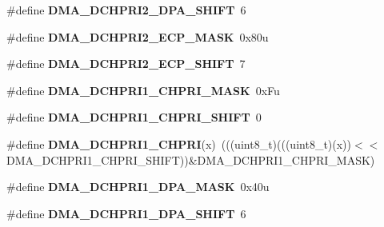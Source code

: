 \begin{DoxyCompactItemize}
\item 
\#define {\bfseries D\+M\+A\+\_\+\+D\+C\+H\+P\+R\+I2\+\_\+\+D\+P\+A\+\_\+\+S\+H\+I\+FT}~6\hypertarget{group__DMA__Register__Masks_ga1bb0bb4e70fc28664327a789d7b3f174}{}\label{group__DMA__Register__Masks_ga1bb0bb4e70fc28664327a789d7b3f174}

\item 
\#define {\bfseries D\+M\+A\+\_\+\+D\+C\+H\+P\+R\+I2\+\_\+\+E\+C\+P\+\_\+\+M\+A\+SK}~0x80u\hypertarget{group__DMA__Register__Masks_ga5d73d5f6aae29465206f72cda9bccde6}{}\label{group__DMA__Register__Masks_ga5d73d5f6aae29465206f72cda9bccde6}

\item 
\#define {\bfseries D\+M\+A\+\_\+\+D\+C\+H\+P\+R\+I2\+\_\+\+E\+C\+P\+\_\+\+S\+H\+I\+FT}~7\hypertarget{group__DMA__Register__Masks_ga139a8b64a74b8009c858a68687a388aa}{}\label{group__DMA__Register__Masks_ga139a8b64a74b8009c858a68687a388aa}

\item 
\#define {\bfseries D\+M\+A\+\_\+\+D\+C\+H\+P\+R\+I1\+\_\+\+C\+H\+P\+R\+I\+\_\+\+M\+A\+SK}~0x\+Fu\hypertarget{group__DMA__Register__Masks_ga5a655b5899c5da64b36029329ff25fb8}{}\label{group__DMA__Register__Masks_ga5a655b5899c5da64b36029329ff25fb8}

\item 
\#define {\bfseries D\+M\+A\+\_\+\+D\+C\+H\+P\+R\+I1\+\_\+\+C\+H\+P\+R\+I\+\_\+\+S\+H\+I\+FT}~0\hypertarget{group__DMA__Register__Masks_ga3270315532805b61a878d4ab0e96045f}{}\label{group__DMA__Register__Masks_ga3270315532805b61a878d4ab0e96045f}

\item 
\#define {\bfseries D\+M\+A\+\_\+\+D\+C\+H\+P\+R\+I1\+\_\+\+C\+H\+P\+RI}(x)~(((uint8\+\_\+t)(((uint8\+\_\+t)(x))$<$$<$D\+M\+A\+\_\+\+D\+C\+H\+P\+R\+I1\+\_\+\+C\+H\+P\+R\+I\+\_\+\+S\+H\+I\+FT))\&D\+M\+A\+\_\+\+D\+C\+H\+P\+R\+I1\+\_\+\+C\+H\+P\+R\+I\+\_\+\+M\+A\+SK)\hypertarget{group__DMA__Register__Masks_gaddf04b7fae51a71b6e019f4b9394d156}{}\label{group__DMA__Register__Masks_gaddf04b7fae51a71b6e019f4b9394d156}

\item 
\#define {\bfseries D\+M\+A\+\_\+\+D\+C\+H\+P\+R\+I1\+\_\+\+D\+P\+A\+\_\+\+M\+A\+SK}~0x40u\hypertarget{group__DMA__Register__Masks_ga6a463897cc661b31a11d35fa0f31671a}{}\label{group__DMA__Register__Masks_ga6a463897cc661b31a11d35fa0f31671a}

\item 
\#define {\bfseries D\+M\+A\+\_\+\+D\+C\+H\+P\+R\+I1\+\_\+\+D\+P\+A\+\_\+\+S\+H\+I\+FT}~6\hypertarget{group__DMA__Register__Masks_ga88db9a46c344a07de9dc96e527e97e4f}{}\label{group__DMA__Register__Masks_ga88db9a46c344a07de9dc96e527e97e4f}


\end{DoxyCompactItemize}
